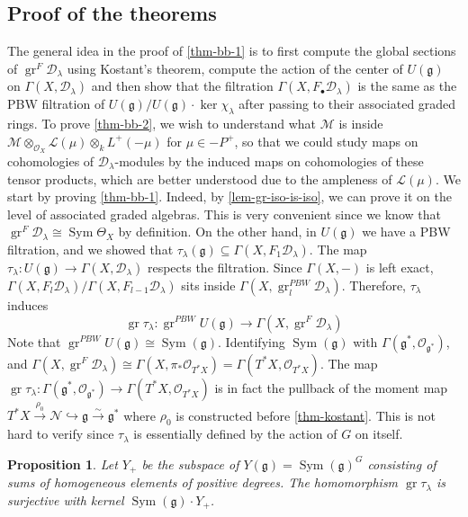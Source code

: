 \documentclass[11pt, a4paper]{article}
\newtheorem{proposition}[theorem]{Proposition}
\theoremstyle{definition}
\newcommand{\gr}{\operatorname{gr}}
\newcommand{\Sym}[0]{\operatorname{Sym}}
\newcommand{\g}{\mathfrak g}
\begin{document}
    \subsection{Proof of the theorems}
    The general idea in the proof of \cref{thm-bb-1} is to first compute the global sections of $\gr^F\mathcal D_\lambda$ using Kostant's theorem, compute the action of the center of $U(\g)$ on $\Gamma(X, \mathcal D_\lambda)$ and then show that the filtration $\Gamma(X, F_\bullet\mathcal D_\lambda)$ is the same as the PBW filtration of $U(\g)/U(\g)\cdot\ker\chi_\lambda$ after passing to their associated graded rings. To prove \cref{thm-bb-2}, we wish to understand what $\mathcal M$ is inside $\mathcal M\otimes_{\mathcal O_X} \mathcal L(\mu)\otimes_kL^+(-\mu)$ for $\mu\in -P^+$, so that we could study maps on cohomologies of $\mathcal D_\lambda$-modules by the induced maps on cohomologies of these tensor products, which are better understood due to the ampleness of $\mathcal L(\mu)$. We start by proving \cref{thm-bb-1}. Indeed, by \cref{lem-gr-iso-is-iso}, we can prove it on the level of associated graded algebras. This is very convenient since we know that $\gr^F\mathcal D_\lambda\cong \Sym\Theta_X$ by definition. On the other hand, in $U(\g)$ we have a PBW filtration, and we showed that $\tau_\lambda(\g)\subseteq \Gamma(X, F_1\mathcal D_\lambda)$. The map $\tau_\lambda:U(\g)\to \Gamma(X, \mathcal D_\lambda)$ respects the filtration. Since $\Gamma(X, -)$ is left exact, $\Gamma(X, F_l\mathcal D_\lambda)/\Gamma(X, F_{l-1}\mathcal D_\lambda)$ sits inside $\Gamma(X, \gr^{\mathit{PBW}}_l\mathcal D_\lambda)$. Therefore, $\tau_\lambda$ induces
    \[\gr\tau_\lambda:\gr^{\mathit{PBW}} U(\g)\to\Gamma(X, \gr^F\mathcal D_\lambda)\]
    Note that $\gr^{\mathit{PBW}} U(\g)\cong\Sym(\g)$. Identifying $\Sym(\g)$ with $\Gamma(\g^*,\mathcal O_{\g^*})$, and $\Gamma(X, \gr^F\mathcal D_\lambda)\cong\Gamma(X, \pi_*\mathcal O_{T^*X})=\Gamma(T^*X,\mathcal O_{T^*X})$. The map $\gr\tau_\lambda:\Gamma(\g^*,\mathcal O_{\g^*})\to \Gamma(T^*X,\mathcal O_{T^*X})$ is in fact the pullback of the moment map $T^*X\xrightarrow{\rho_0}\mathscr N\hookrightarrow\g\xrightarrow{\sim}\g^*$ where $\rho_0$ is constructed before \cref{thm-kostant}. This is not hard to verify since $\tau_\lambda$ is essentially defined by the action of $G$ on itself.
    \begin{proposition}\label{prop-gr-tau}
        Let $Y_+$ be the subspace of $Y(\g)=\Sym(\g)^G$ consisting of sums of homogeneous elements of positive degrees. The homomorphism $\gr\tau_\lambda$ is surjective with kernel $\Sym(\g)\cdot Y_+$.
    \end{proposition}
\end{document}

